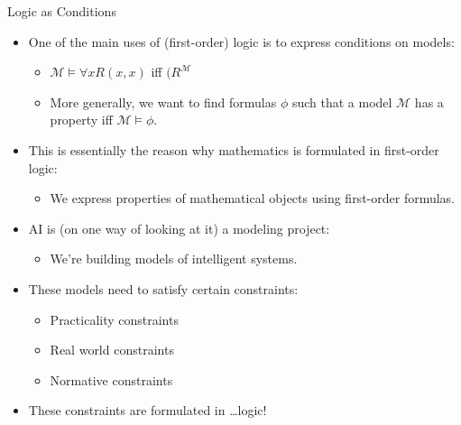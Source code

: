 \begin{frame}{Logic as Conditions}

  \begin{itemize}
  \item One of the main uses of (first-order) logic is to express
    conditions on models:

    \begin{itemize}
    \item $\mathcal{M}\vDash \forall xR(x,x)$ iff $(R^\mathcal{M}$ 

      \item More generally, we want to find formulas $\phi$ such that
        a model $\mathcal{M}$ has a property iff $\mathcal{M}\vDash\phi$.
    \end{itemize}

    \item This is essentially the reason why mathematics is formulated
      in first-order logic:
      \begin{itemize}
      \item We express properties of mathematical objects using
        first-order formulas.
      \end{itemize}
      
      \item AI is (on one way of looking at it) a modeling project:
        \begin{itemize}
        \item We're building models of intelligent systems.
        \end{itemize}
       \item These models need to satisfy certain constraints:
         \begin{itemize}
           \item Practicality constraints
           \item Real world constraints
             \item Normative constraints
         \end{itemize}
         \item These constraints are formulated in \dots logic!

  \end{itemize}
  
\end{frame}

